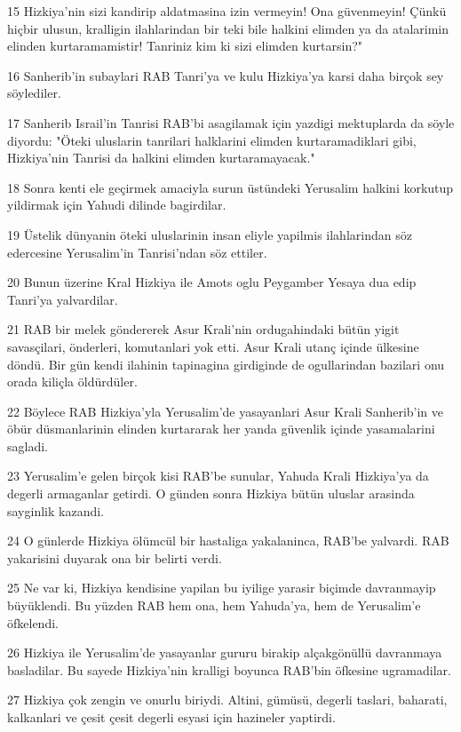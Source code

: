 \par 15 Hizkiya'nin sizi kandirip aldatmasina izin vermeyin! Ona güvenmeyin! Çünkü hiçbir ulusun, kralligin ilahlarindan bir teki bile halkini elimden ya da atalarimin elinden kurtaramamistir! Tanriniz kim ki sizi elimden kurtarsin?"
\par 16 Sanherib'in subaylari RAB Tanri'ya ve kulu Hizkiya'ya karsi daha birçok sey söylediler.
\par 17 Sanherib Israil'in Tanrisi RAB'bi asagilamak için yazdigi mektuplarda da söyle diyordu: "Öteki uluslarin tanrilari halklarini elimden kurtaramadiklari gibi, Hizkiya'nin Tanrisi da halkini elimden kurtaramayacak."
\par 18 Sonra kenti ele geçirmek amaciyla surun üstündeki Yerusalim halkini korkutup yildirmak için Yahudi dilinde bagirdilar.
\par 19 Üstelik dünyanin öteki uluslarinin insan eliyle yapilmis ilahlarindan söz edercesine Yerusalim'in Tanrisi'ndan söz ettiler.
\par 20 Bunun üzerine Kral Hizkiya ile Amots oglu Peygamber Yesaya dua edip Tanri'ya yalvardilar.
\par 21 RAB bir melek göndererek Asur Krali'nin ordugahindaki bütün yigit savasçilari, önderleri, komutanlari yok etti. Asur Krali utanç içinde ülkesine döndü. Bir gün kendi ilahinin tapinagina girdiginde de ogullarindan bazilari onu orada kiliçla öldürdüler.
\par 22 Böylece RAB Hizkiya'yla Yerusalim'de yasayanlari Asur Krali Sanherib'in ve öbür düsmanlarinin elinden kurtararak her yanda güvenlik içinde yasamalarini sagladi.
\par 23 Yerusalim'e gelen birçok kisi RAB'be sunular, Yahuda Krali Hizkiya'ya da degerli armaganlar getirdi. O günden sonra Hizkiya bütün uluslar arasinda sayginlik kazandi.
\par 24 O günlerde Hizkiya ölümcül bir hastaliga yakalaninca, RAB'be yalvardi. RAB yakarisini duyarak ona bir belirti verdi.
\par 25 Ne var ki, Hizkiya kendisine yapilan bu iyilige yarasir biçimde davranmayip büyüklendi. Bu yüzden RAB hem ona, hem Yahuda'ya, hem de Yerusalim'e öfkelendi.
\par 26 Hizkiya ile Yerusalim'de yasayanlar gururu birakip alçakgönüllü davranmaya basladilar. Bu sayede Hizkiya'nin kralligi boyunca RAB'bin öfkesine ugramadilar.
\par 27 Hizkiya çok zengin ve onurlu biriydi. Altini, gümüsü, degerli taslari, baharati, kalkanlari ve çesit çesit degerli esyasi için hazineler yaptirdi.
